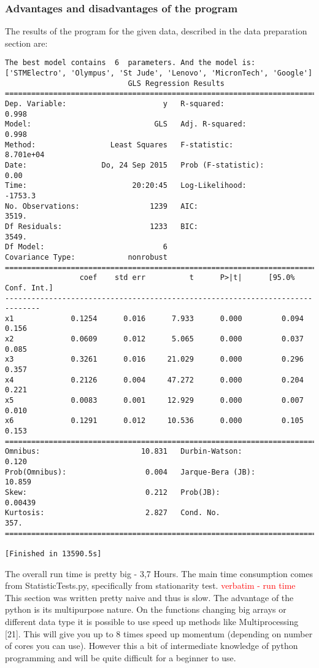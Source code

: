 \documentclass{article}
\begin{document}
\subsubsection{Advantages and disadvantages of the program}
The results of the program for the given data, described in the data preparation section are:
\begin{verbatim}
The best model contains  6  parameters. And the model is:
['STMElectro', 'Olympus', 'St Jude', 'Lenovo', 'MicronTech', 'Google']
                            GLS Regression Results                            
==============================================================================
Dep. Variable:                      y   R-squared:                       0.998
Model:                            GLS   Adj. R-squared:                  0.998
Method:                 Least Squares   F-statistic:                 8.701e+04
Date:                 Do, 24 Sep 2015   Prob (F-statistic):               0.00
Time:                        20:20:45   Log-Likelihood:                -1753.3
No. Observations:                1239   AIC:                             3519.
Df Residuals:                    1233   BIC:                             3549.
Df Model:                           6                                         
Covariance Type:            nonrobust                                         
==============================================================================
                 coef    std err          t      P>|t|      [95.0% Conf. Int.]
------------------------------------------------------------------------------
x1             0.1254      0.016      7.933      0.000         0.094     0.156
x2             0.0609      0.012      5.065      0.000         0.037     0.085
x3             0.3261      0.016     21.029      0.000         0.296     0.357
x4             0.2126      0.004     47.272      0.000         0.204     0.221
x5             0.0083      0.001     12.929      0.000         0.007     0.010
x6             0.1291      0.012     10.536      0.000         0.105     0.153
==============================================================================
Omnibus:                       10.831   Durbin-Watson:                   0.120
Prob(Omnibus):                  0.004   Jarque-Bera (JB):               10.859
Skew:                           0.212   Prob(JB):                      0.00439
Kurtosis:                       2.827   Cond. No.                         357.
==============================================================================

[Finished in 13590.5s]
\end{verbatim}
The overall run time is pretty big - 3,7 Hours. The main time consumption comes from StatisticTests.py, specifically from stationarity test.
\textcolor{red}{verbatim - run time}
This section was written pretty naive and thus is slow. The advantage of the python is its multipurpose nature. On the functions changing big arrays or different data type it is possible to use speed up methods like Multiprocessing [21]. This will give you up to 8 times speed up momentum (depending on number of cores you can use). However this a bit of intermediate knowledge of python programming and will be quite difficult for a beginner to use.
\end{document}
